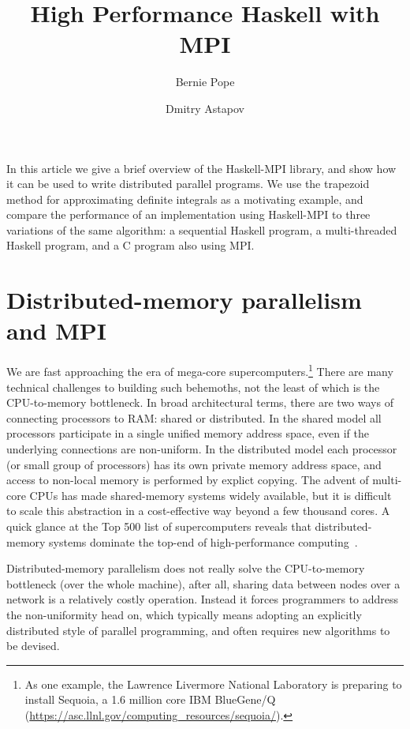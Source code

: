 \documentclass{tmr}
\title{High Performance Haskell with MPI}
\author{Bernie Pope\email{bjpope@unimelb.edu.au}}
\author{Dmitry Astapov\email{dastapov@gmail.com}}
\begin{document}
\begin{introduction}
In this article we give a brief overview of the Haskell-MPI library, and show how it can be used to write distributed
parallel programs. We use the trapezoid method for approximating definite integrals as a motivating example,
and compare the performance of an implementation using Haskell-MPI to three variations of the same algorithm: a sequential
Haskell program, a multi-threaded Haskell program, and a C program also using MPI.
\end{introduction}

\section{Distributed-memory parallelism and MPI}

We are fast approaching the era of mega-core
supercomputers.\footnote{As one example, the Lawrence Livermore National Laboratory
is preparing to install Sequoia, a 1.6 million core IBM
BlueGene/Q (\url{https://asc.llnl.gov/computing_resources/sequoia/}).} There are many technical
challenges to building such behemoths, not the least of which is
the CPU-to-memory bottleneck. In broad architectural terms, there are two ways of connecting processors
to RAM: shared or distributed. In the shared model all processors participate in a single unified memory address space, even if
the underlying connections are non-uniform. In the distributed model each processor (or small group
of processors) has its own private memory address space, and access to non-local memory is
performed by explict copying. The advent of multi-core CPUs has made shared-memory systems
widely available, but it is difficult to scale this abstraction in a
cost-effective way beyond a few thousand cores. A quick glance at the Top 500 list of supercomputers reveals
that distributed-memory systems dominate the top-end of high-performance computing~\cite{top-500}.

Distributed-memory parallelism does not really solve the CPU-to-memory bottleneck (over the whole machine),
after all, sharing data between nodes over a network is a relatively costly operation.
Instead it forces programmers to
address the non-uniformity head on, which typically means adopting an explicitly distributed style of
parallel programming, and often requires new algorithms to be devised.
\end{document}
